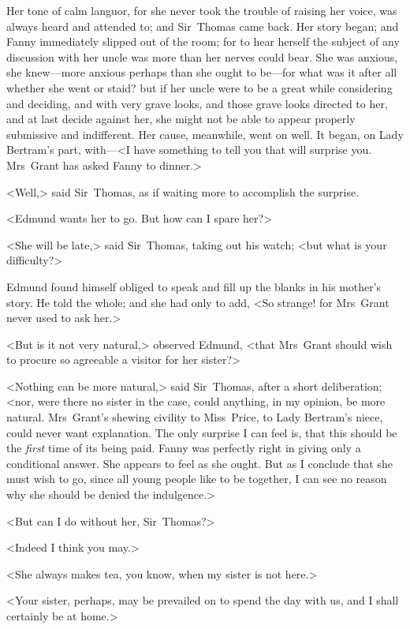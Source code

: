 Her tone of calm languor, for she never took the trouble of raising her voice, was always heard and attended to; and Sir~Thomas came back. Her story began; and Fanny immediately slipped out of the room; for to hear herself the subject of any discussion with her uncle was more than her nerves could bear. She was anxious, she knew—more anxious perhaps than she ought to be—for what was it after all whether she went or staid? but if her uncle were to be a great while considering and deciding, and with very grave looks, and those grave looks directed to her, and at last decide against her, she might not be able to appear properly submissive and indifferent. Her cause, meanwhile, went on well. It began, on Lady Bertram's part, with—<I have something to tell you that will surprise you. Mrs~Grant has asked Fanny to dinner.>

<Well,> said Sir~Thomas, as if waiting more to accomplish the surprise.

<Edmund wants her to go. But how can I spare her?>

<She will be late,> said Sir~Thomas, taking out his watch; <but what is your difficulty?>

Edmund found himself obliged to speak and fill up the blanks in his mother's story. He told the whole; and she had only to add, <So strange! for Mrs~Grant never used to ask her.>

<But is it not very natural,> observed Edmund, <that Mrs~Grant should wish to procure so agreeable a visitor for her sister?>

<Nothing can be more natural,> said Sir~Thomas, after a short deliberation; <nor, were there no sister in the case, could anything, in my opinion, be more natural. Mrs~Grant's shewing civility to Miss~Price, to Lady Bertram's niece, could never want explanation. The only surprise I can feel is, that this should be the \textit{first}  time of its being paid. Fanny was perfectly right in giving only a conditional answer. She appears to feel as she ought. But as I conclude that she must wish to go, since all young people like to be together, I can see no reason why she should be denied the indulgence.>

<But can I do without her, Sir~Thomas?>

<Indeed I think you may.>

<She always makes tea, you know, when my sister is not here.>

<Your sister, perhaps, may be prevailed on to spend the day with us, and I shall certainly be at home.>

